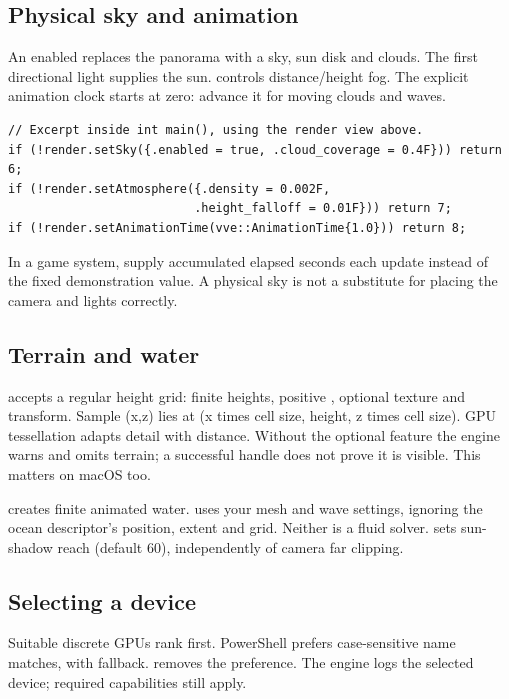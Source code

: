 \documentclass[11pt,a4paper]{article}
\begin{document}
\subsection*{Physical sky and animation}
An enabled  replaces the panorama with a sky, sun disk and clouds. The first directional light supplies the sun.  controls distance/height fog. The explicit animation clock starts at zero: advance it for moving clouds and waves.
\begin{lstlisting}
// Excerpt inside int main(), using the render view above.
if (!render.setSky({.enabled = true, .cloud_coverage = 0.4F})) return 6;
if (!render.setAtmosphere({.density = 0.002F,
                          .height_falloff = 0.01F})) return 7;
if (!render.setAnimationTime(vve::AnimationTime{1.0})) return 8;
\end{lstlisting}
In a game system, supply accumulated elapsed seconds each update instead of the fixed demonstration value. A physical sky is not a substitute for placing the camera and lights correctly.

\subsection*{Terrain and water}
 accepts a regular height grid:  finite heights, positive , optional texture and transform. Sample (x,z) lies at (x times cell size, height, z times cell size). GPU tessellation adapts detail with distance. Without the optional  feature the engine warns and omits terrain; a successful handle does not prove it is visible. This matters on macOS too.

 creates finite animated water.  uses your mesh and wave settings, ignoring the ocean descriptor's position, extent and grid. Neither is a fluid solver.  sets sun-shadow reach (default 60), independently of camera far clipping.

\subsection*{Selecting a device}
Suitable discrete GPUs rank first. PowerShell  prefers case-sensitive name matches, with fallback.  removes the preference. The engine logs the selected device; required capabilities still apply.
\end{document}
